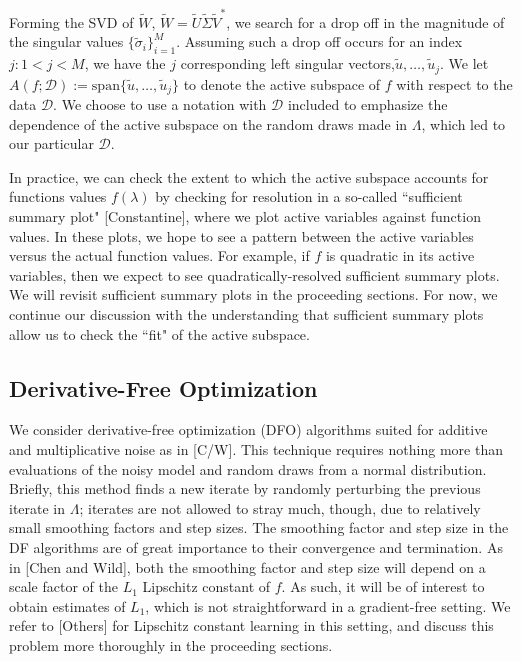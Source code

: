 \documentclass{amsart}
\begin{document}
Forming the SVD of $\tilde{W}$, $\tilde{W}=\tilde{U}\tilde{\Sigma}\tilde{V}^*$, we search for a drop off in the magnitude of the singular values $\{\tilde{\sigma}_i\}_{i=1}^M$. Assuming such a drop off occurs for an index $j:1<j<M$, we have the $j$ corresponding left singular vectors,$ \tilde{u},\ldots,\tilde{u}_{j}$.  We let $A\left(f;\mathcal{D}\right):=\text{span}\{\tilde{u},\ldots,\tilde{u}_{j}\}$ to denote the active subspace of $f$ with respect to the data $\mathcal{D}$. We choose to use a notation with $\mathcal{D}$ included to emphasize the dependence of the active subspace on the random draws made in $\Lambda$, which led to our particular $\mathcal{D}$.

In practice, we can check the extent to which the active subspace accounts for functions values $f(\lambda)$ by checking for resolution in a so-called ``sufficient summary plot" [Constantine], where we plot active variables against function values. In these plots, we hope to see a pattern between the active variables versus the actual function values. For example, if $f$ is quadratic in its active variables, then we expect to see quadratically-resolved sufficient summary plots. We will revisit sufficient summary plots in the proceeding sections. For now, we continue our discussion with the understanding that sufficient summary plots allow us to check the ``fit" of the active subspace.





\subsection{Derivative-Free Optimization}


We consider derivative-free optimization (DFO) algorithms suited for additive and multiplicative noise as in [C/W]. This technique requires nothing more than evaluations of the noisy model and random draws from a normal distribution. Briefly, this method finds a new iterate by randomly perturbing the previous iterate in $\Lambda$; iterates are not allowed to stray much, though, due to relatively small smoothing factors and step sizes. The smoothing factor and step size in the DF algorithms are of great importance to their convergence and termination. As in [Chen and Wild], both the smoothing factor and step size will depend on a scale factor of the $L_1$ Lipschitz constant of $f$. As such, it will be of interest to obtain estimates of $L_1$, which is not straightforward in a gradient-free setting. We refer to [Others] for Lipschitz constant learning in this setting, and discuss this problem more thoroughly in the proceeding sections.
\end{document}
